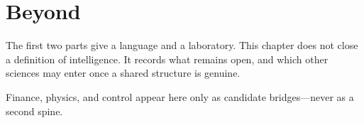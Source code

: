 \chapter{Beyond}
\label{ch:beyond}

The first two parts give a language and a laboratory. This chapter does not close a definition of intelligence. It records what remains open, and which other sciences may enter once a shared structure is genuine.

Finance, physics, and control appear here only as candidate bridges---never as a second spine.
